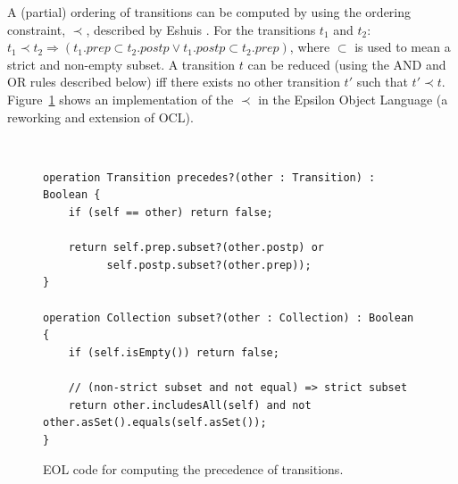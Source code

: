 \documentclass[submission,copyright,creativecommons]{eptcs}
\begin{document}
A (partial) ordering of transitions can be computed by using the ordering constraint, $\prec$, described by Eshuis \cite{eshuis09translating}. For the transitions $t_1$ and $t_2$: $t_1 \prec t_2 \Rightarrow (t_1.prep \subset t_2.postp \lor t_1.postp \subset t_2.prep)$, where $\subset$ is used to mean a strict and non-empty subset. A transition $t$ can be reduced (using the AND and OR rules described below) iff there exists no other transition $t'$ such that $t' \prec t$. Figure~\ref{fig:eol-precedence} shows an implementation of the $\prec$ in the Epsilon Object Language \cite{kolovos06eol} (a reworking and extension of OCL).

\begin{figure}
{\tiny {}
\tt
\begin{lstlisting}
operation Transition precedes?(other : Transition) : Boolean {
	if (self == other) return false;
	
	return self.prep.subset?(other.postp) or
          self.postp.subset?(other.prep));
}

operation Collection subset?(other : Collection) : Boolean {
	if (self.isEmpty()) return false;

	// (non-strict subset and not equal) => strict subset
	return other.includesAll(self) and not other.asSet().equals(self.asSet());
}
\end{lstlisting}
\rm
}{\tiny \par}

\caption{\label{fig:eol-precedence}EOL code for computing the precedence of transitions.}

\end{figure}
\end{document}
